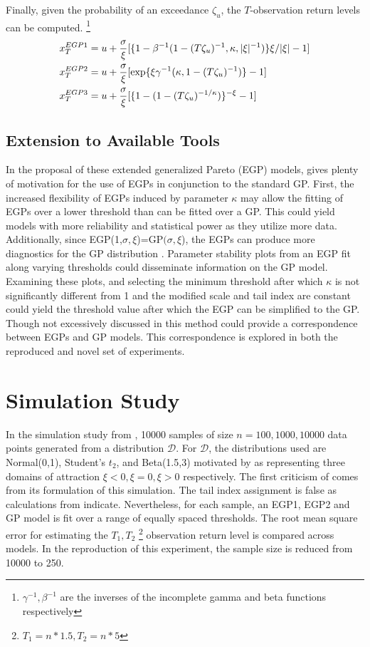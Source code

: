 \documentclass[12pt]{article}
\theoremstyle{definition}
\theoremstyle{definition}
\begin{document}
Finally, given the probability of an exceedance $\zeta_u$, the $T$-observation return levels can be computed. \footnote{$\gamma^{-1}, \beta^{-1}$ are the inverses of the incomplete gamma and beta functions respectively}
\begin{align*}
    x_T^{EGP1}&= u + \frac{\sigma}{\xi} [\{1-\beta^{-1}(1-(T\zeta_u)^{-1},\kappa, |\xi|^{-1})\}{\-\xi/|\xi|}-1]\\
    x_T^{EGP2}&= u + \frac{\sigma}{\xi} [\exp\{\xi\gamma^{-1}(\kappa,1-(T\zeta_u)^{-1})\}-1]\\
    x_T^{EGP3}&= u + \frac{\sigma}{\xi}[\{1-(1-(T\zeta_u)^{-1/\kappa})\}^{-\xi}-1]
\end{align*}

\subsection{Extension to Available Tools }
In the proposal of these extended generalized Pareto (EGP) models, \cite{papatawn} gives plenty of motivation for the use of EGPs in conjunction to the standard GP. First, the increased flexibility of EGPs induced by parameter $\kappa$ may allow the fitting of EGPs over a lower threshold than can be fitted over a GP. This could yield models with more reliability and statistical power as they utilize more data. Additionally, since EGP(1,$\sigma,\xi$)=GP$(\sigma,\xi$), the EGPs can produce more diagnostics for the GP distribution \cite{papatawn}. Parameter stability plots from an EGP fit along varying thresholds could disseminate information on the GP model. Examining these plots, and selecting the minimum threshold after which $\kappa$ is not significantly different from 1 and the modified scale and tail index are constant could yield the threshold value after which the EGP can be simplified to the GP. Though not excessively discussed in \cite{papatawn} this method could provide a correspondence between EGPs and GP models. This correspondence is explored in both the reproduced and novel set of experiments.


\section{Simulation Study}
In the simulation study from \cite{papatawn}, 10000 samples of size $n=100,1000, 10000$ data points generated from a distribution $\mathcal{D}$. For $\mathcal{D}$, the distributions used are Normal(0,1), Student's $t_2$, and Beta(1.5,3) motivated by \cite{papatawn} as representing three domains of attraction $\xi<0, \xi=0, \xi>0$ respectively. The first criticism of \cite{papatawn} comes from its formulation of this simulation. The tail index assignment is false as calculations from \cite{index} indicate. Nevertheless, for each sample, an EGP1, EGP2 and GP model is fit over a range of equally spaced thresholds. The root mean square error for estimating the $T_1, T_2$ \footnote{$T_1=n*1.5 , T_2=n*5$} observation return level is compared across models. In the reproduction of this experiment, the sample size is reduced from 10000 to 250. 
\end{document}
